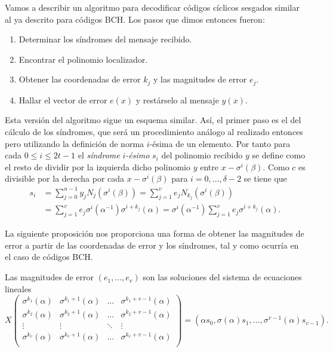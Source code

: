 Vamos a describir un algoritmo para decodificar códigos cíclicos sesgados similar al ya descrito para códigos BCH.
Los pasos que dimos entonces fueron: \begin{enumerate}
  \item Determinar los síndromes del mensaje recibido.
  \item Encontrar el polinomio localizador.
  \item Obtener las coordenadas de error \(k_j\) y las magnitudes de error \(e_{j}\).
  \item Hallar el vector de error \(e(x)\) y restárselo al mensaje \(y(x)\).
\end{enumerate}
Esta versión del algoritmo sigue un esquema similar.
Así, el primer paso es el del cálculo de los síndromes, que será un procedimiento análogo al realizado entonces pero utilizando la definición de norma \(i\)-ésima de un elemento.
Por tanto para cada \(0 \leq i \leq 2t - 1\) el \emph{síndrome} \(i\)\emph{-ésimo} \(s_i\) del polinomio recibido \(y\) se define como el resto de dividir por la izquierda dicho polinomio \(y\) entre \(x - \sigma^{i}(\beta)\).
Como \(c\) es divisible por la derecha por cada \(x - \sigma^{i}(\beta)\) para \(i = 0, \dots, \delta - 2\) se tiene que 
\begin{align}
  s_i &= \sum_{j = 0}^{n-1}y_jN_j(\sigma^{i}(\beta)) = \sum_{j=1}^{v}e_jN_{k_j}(\sigma^{i}(\beta))\nonumber\\
   &= \sum_{j = 1}^{v}e_j\sigma^{i}(\alpha^{-1})\sigma^{i+k_j}(\alpha) = \sigma^{i}(\alpha^{-1})\sum_{j = 1}^{v}e_j\sigma^{i+k_j}(\alpha).
   \label{eq:sindromes-sesgados}
\end{align}

La siguiente proposición nos proporciona una forma de obtener las magnitudes de error a partir de las coordenadas de error y los síndromes, tal y como ocurría en el caso de códigos BCH.

\begin{proposition}
  \label{prop:pgz-sesgados-magnitudes-error}
  Las magnitudes de error \((e_{1}, \dots, e_{v})\) son las soluciones del sistema de ecuaciones lineales
  \[
    X \begin{pmatrix}
     \sigma^{k_1}(\alpha) & \sigma^{k_1 + 1}(\alpha) & \dots & \sigma^{k_1 + v - 1}(\alpha)\\ 
     \sigma^{k_2}(\alpha) & \sigma^{k_2 + 1}(\alpha) & \dots & \sigma^{k_2 + v - 1}(\alpha)\\ 
     \vdots & \vdots & \ddots & \vdots\\ 
     \sigma^{k_v}(\alpha) & \sigma^{k_v + 1}(\alpha) & \dots & \sigma^{k_v + v - 1}(\alpha)\\ 
    \end{pmatrix}
    = (\alpha s_0, \sigma(\alpha)s_1, \dots, \sigma^{v-1}(\alpha)s_{v-1}).
  \]
\end{proposition}

